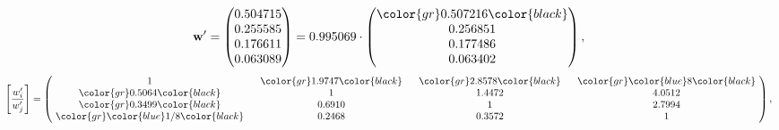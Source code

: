 \begin{example}
\begin{equation*}
\mathbf{w}^{\prime} =
\begin{pmatrix}
0.504715\\
0.255585\\
0.176611\\
0.063089
\end{pmatrix} =
0.995069\cdot
\begin{pmatrix}
\color{gr} 0.507216\color{black} \\
0.256851\\
0.177486\\
0.063402
\end{pmatrix},
\end{equation*}
\begin{equation*}
\left[ \frac{{w}^{\prime}_i}{{w}^{\prime}_j} \right] =
\begin{pmatrix}
$\,\,$ 1 $\,\,$ & $\,\,$\color{gr} 1.9747\color{black} $\,\,$ & $\,\,$\color{gr} 2.8578\color{black} $\,\,$ & $\,\,$\color{gr} \color{blue} 8\color{black} $\,\,$ \\
$\,\,$\color{gr} 0.5064\color{black} $\,\,$ & $\,\,$ 1 $\,\,$ & $\,\,$1.4472$\,\,$ & $\,\,$4.0512  $\,\,$ \\
$\,\,$\color{gr} 0.3499\color{black} $\,\,$ & $\,\,$0.6910$\,\,$ & $\,\,$ 1 $\,\,$ & $\,\,$2.7994 $\,\,$ \\
$\,\,$\color{gr} \color{blue}  1/8\color{black} $\,\,$ & $\,\,$0.2468$\,\,$ & $\,\,$0.3572$\,\,$ & $\,\,$ 1  $\,\,$ \\
\end{pmatrix},
\end{equation*}
\end{example}
\newpage
